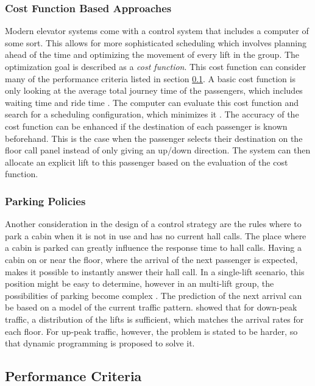 \subsubsection{Cost Function Based Approaches}
Modern elevator systems come with a control system that includes a computer of some sort.
This allows for more sophisticated scheduling which involves planning ahead of the time and optimizing the movement of every lift in the group.
\autocite[][pp.261ff]{barney2016handbook}
The optimization goal is described as a \emph{cost function}.
This cost function can consider many of the performance criteria listed in section \ref{sec:sota:perf}.
A basic cost function is only looking at the average total journey time of the passengers, which includes waiting time and ride time
\autocite[][pp.278ff]{barney2016handbook}.
The computer can evaluate this cost function and search for a scheduling configuration, which minimizes it 
\autocite[][pp.~3--6]{axelsson2013strategies}.
The accuracy of the cost function can be enhanced if 
the destination of each passenger is known beforehand.
This is the case when the passenger selects their destination on the floor call panel instead of only giving an up/down direction.
The system can then allocate an explicit lift to this passenger based on the evaluation of the cost function.

\subsubsection{Parking Policies}
Another consideration in the design of a control strategy are the rules where to park a cabin when it is not in use and has no current hall calls.
The place where a cabin is parked can greatly influence the response time to hall calls.
Having a cabin on or near the floor, where the arrival of the next passenger is expected, 
makes it possible to instantly answer their hall call.
In a single-lift scenario, this position might be easy to determine, 
however in an multi-lift group, the possibilities of parking become complex \autocite[][pp.~3]{beers2015arrivals}.
The prediction of the next arrival can be based on a model of the current traffic pattern.
\textcite{brand2004parking} showed that for down-peak traffic, a distribution of the lifts is sufficient, which matches the arrival rates for each floor.
For up-peak traffic, however, the problem is stated to be harder, 
so that dynamic programming is proposed to solve it.


\subsection{Performance Criteria}
\label{sec:sota:perf}

